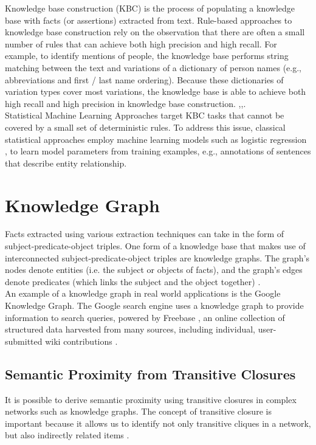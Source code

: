 \documentclass[10pt,11pt,12pt,oneside]{book}
\begin{document}
	Knowledge base construction (KBC) is the process of populating a knowledge base with facts (or assertions) extracted from text. Rule-based approaches to knowledge base construction rely on the observation that there are often a small number of rules that can achieve both high precision and high recall. For example, to identify mentions of people, the knowledge base performs string matching between the text and variations of a dictionary of person names (e.g., abbreviations and first / last name ordering). Because these dictionaries of variation types cover most variations, the knowledge base is able to achieve both high recall and high precision in knowledge base construction. \cite{hayes1983building},\cite{arasu2003extracting},\cite{mooney1999relational}.\\
	Statistical Machine Learning Approaches target KBC tasks that cannot be covered by a small set of deterministic rules. To address this issue, classical statistical approaches employ machine learning models such as logistic regression \cite {michelakis_krishnamurthy_haas_vaithyanathan_2009}, \cite{lafferty2001conditional} to learn model parameters from training examples, e.g., annotations of sentences that describe entity relationship.\\
	
	
	\section{Knowledge Graph}
	
	Facts extracted using various extraction techniques can take in the form of subject-predicate-object triples. One form of a knowledge base that makes use of interconnected subject-predicate-object triples are knowledge graphs. The graph’s nodes denote entities (i.e. the subject or objects of facts), and the graph’s edges denote predicates (which links the subject and the object together) \cite{sutton2004collective}.\\
	
	An example of a knowledge graph in real world applications is the Google Knowledge Graph. The Google search engine uses a knowledge graph to provide information to search queries, powered by Freebase \cite{goog_kg}, an online collection of structured data harvested from many sources, including individual, user-submitted wiki contributions \cite{freebase}.
	
	\subsection{Semantic Proximity from Transitive Closures}
	It is possible to derive semantic proximity using transitive closures in complex networks such as knowledge graphs. The concept of transitive closure is important because it allows us to identify not only transitive cliques in a network, but also indirectly related items \cite{SIMAS2015}.\\
	
\end{document}
